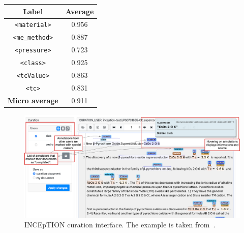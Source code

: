 \documentclass[]{interact}
\theoremstyle{plain}%
\theoremstyle{definition}
\theoremstyle{remark}
\begin{document}
\begin{table}[ht]
    {\begin{tabular}{ cc } 
    \toprule
        \textbf{Label} & \textbf{Average}\\
    \midrule
        \texttt{<material>}     &   0.956   \\
        \texttt{<me\_method>}   &	0.887   \\
        \texttt{<pressure>}     &	0.723   \\
        \texttt{<class>}        &	0.925   \\
        \texttt{<tcValue>}      &	0.863   \\
        \texttt{<tc>}           &	0.831   \\
    \midrule
        \textbf{Micro average}        &	0.911	\\
    \bottomrule
    \end{tabular}}
    
    \label{table:average-iaa}
\end{table}




\begin{figure}[htb]
    \centering
    \includegraphics[width=\linewidth]{inception-curation-new.png}
    \caption{INCEpTION curation interface. The example is taken from~\cite{Yonezawa2004NewO}.}
    \label{fig:inception-curation-interface}
\end{figure}
\end{document}
